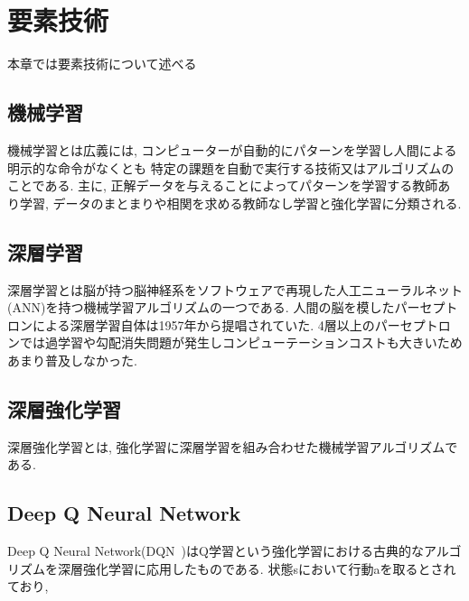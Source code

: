 \chapter{要素技術}
\label{technical_background}

本章では要素技術について述べる


\section{機械学習}

機械学習とは広義には, コンピューターが自動的にパターンを学習し人間による明示的な命令がなくとも
特定の課題を自動で実行する技術又はアルゴリズムのことである. 主に, 正解データを与えることによってパターンを学習する教師あり学習, データのまとまりや相関を求める教師なし学習と強化学習に分類される.


\section{深層学習}

深層学習とは脳が持つ脳神経系をソフトウェアで再現した人工ニューラルネット(ANN)を持つ機械学習アルゴリズムの一つである. 
人間の脳を模したパーセプトロンによる深層学習自体は1957年から提唱されていた. 4層以上のパーセプトロンでは過学習や勾配消失問題が発生しコンピューテーションコストも大きいためあまり普及しなかった.

\section{深層強化学習}

深層強化学習とは, 強化学習に深層学習を組み合わせた機械学習アルゴリズムである.

\section{Deep Q Neural Network}

Deep Q Neural Network(DQN~\cite{DQN})はQ学習という強化学習における古典的なアルゴリズムを深層強化学習に応用したものである.
状態sにおいて行動aを取るとされており, 

